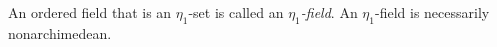 An ordered field that is an $\eta_1$-set is called an \emph{$\eta_1$-field}. An $\eta_1$-field is necessarily nonarchimedean.